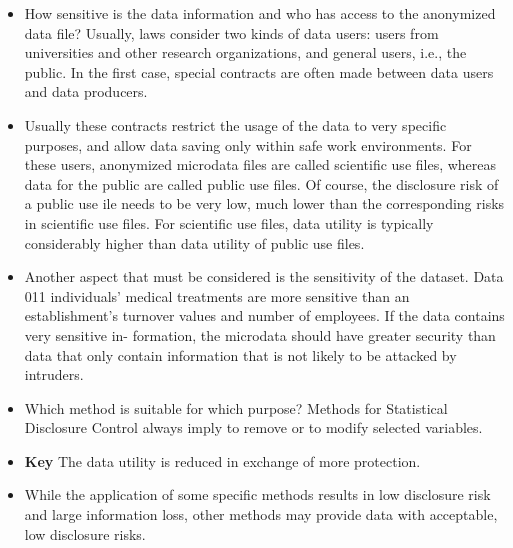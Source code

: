\documentclass{beamer}
\begin{document}
\begin{frame}
	\begin{itemize}
		
		\item How sensitive is the data information and who has access to the anonymized
		data file? Usually, laws consider two kinds of data users: users from universities
		and other research organizations, and general users, i.e., the public. In the ﬁrst
		case, special contracts are often made between data users and data producers.
		
		\item Usually these contracts restrict the usage of the data to very speciﬁc purposes, and
		allow data saving only within safe work environments. For these users, anonymized
		microdata ﬁles are called scientiﬁc use ﬁles, whereas data for the public are called
		public use ﬁles. Of course, the disclosure risk of a public use ile needs to be very
		low, much lower than the corresponding risks in scientiﬁc use ﬁles. For scientiﬁc
		use ﬁles, data utility is typically considerably higher than data utility of public use
		ﬁles.
		
	\end{itemize}
\end{frame}
\begin{frame}
	\begin{itemize}
		\item Another aspect that must be considered is the sensitivity of the dataset. Data
		011 individuals’ medical treatments are more sensitive than an establishment’s
		turnover values and number of employees. If the data contains very sensitive in-
		formation, the microdata should have greater security than data that only contain
		information that is not likely to be attacked by intruders.
	\end{itemize}
\end{frame}
\begin{frame}
	\begin{itemize}
		\item Which method is suitable for which purpose? Methods for Statistical Disclosure Control always imply to remove or to modify selected variables.
		\item \textbf{Key} The data
		utility is reduced in exchange of more protection. 
		\item While the application of some
		specific methods results in low disclosure risk and large information loss, other
		methods may provide data with acceptable, low disclosure risks. 
		
	\end{itemize}
\end{frame}
\end{document}

